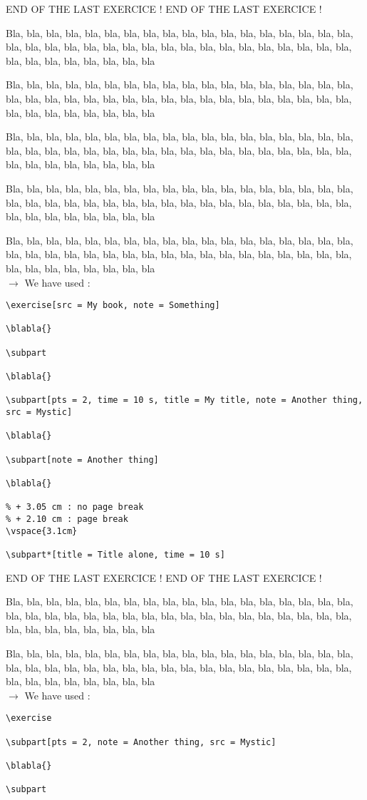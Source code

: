 \documentclass[12pt]{article}
\newcommand\blabla{%
		\noindent Bla, bla, bla, bla, bla, bla, bla, bla, bla, bla, bla,
		bla, bla, bla, bla, bla, bla, bla, bla, bla, bla, bla,
		bla, bla, bla, bla, bla, bla, bla, bla, bla, bla, bla,
		bla, bla, bla, bla, bla, bla, bla, bla, bla, bla, bla
	}
\newcommand\codeused{
		\blabla{} \medskip  \\ \noindent $\rightarrow$ We have used :
	}
\begin{document}
\newpage \medskip \noindent END OF THE LAST EXERCICE ! END OF THE LAST EXERCICE !

\exercise[src = My book, note = Something]
      
\blabla{}

\subpart

\blabla{}

\subpart[pts = 2, time = 10 s, title = My title, note = Another thing, src = Mystic]

\blabla{}

\subpart[note = Another thing]

\blabla{}

\vspace{3.1cm}

\subpart*[title = Title alone, time = 10 s]


\codeused{}

\begin{verbatim}
\exercise[src = My book, note = Something]
      
\blabla{}

\subpart

\blabla{}

\subpart[pts = 2, time = 10 s, title = My title, note = Another thing, src = Mystic]

\blabla{}

\subpart[note = Another thing]

\blabla{}

% + 3.05 cm : no page break
% + 2.10 cm : page break
\vspace{3.1cm}

\subpart*[title = Title alone, time = 10 s]\end{verbatim}



\newpage \medskip \noindent END OF THE LAST EXERCICE ! END OF THE LAST EXERCICE !

\exercise
      
\subpart[pts = 2, note = Another thing, src = Mystic]

\blabla{}

\subpart

\codeused{}

\begin{verbatim}
\exercise
      
\subpart[pts = 2, note = Another thing, src = Mystic]

\blabla{}

\subpart
\end{verbatim}
\end{document}
